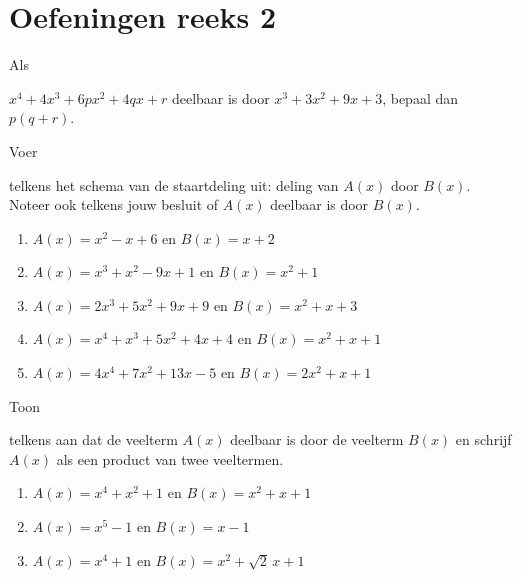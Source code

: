 \documentclass{ximera}
\begin{document}
\section*{Oefeningen reeks 2}

\begin{exercise} 
\hypertarget{oef2.6}{Als} $x^4 + 4x^3 + 6px^2 + 4qx + r$ deelbaar is door $x^3 + 3x^2 + 9x + 3$, bepaal dan $p(q+r)$.
\end{exercise} 

\begin{exercise} 
\hypertarget{oef2.7}{Voer} telkens het schema van de staartdeling uit: deling van $A(x)$ door $B(x)$. Noteer ook telkens jouw besluit of $A(x)$ deelbaar is door $B(x)$.
\begin{enumerate}
\item
$A(x) = x^2-x+6$ \quad en \quad $B(x) = x+2$
\item
$A(x) = x^3+x^2-9x+1$ \quad en \quad $B(x) = x^2+1$
\item
$A(x) = 2x^3 +5x^2+9x+9$ \quad en \quad $B(x) = x^2 + x + 3$ 
\item
$A(x) = x^4 + x^3 + 5x^2 + 4x + 4$ \quad en \quad $B(x) = x^2 + x + 1$  
\item
$A(x) = 4x^4 + 7x^2 + 13x - 5$ \quad en \quad $B(x) = 2x^2 + x + 1$
\end{enumerate}
\end{exercise} 

\pagebreak

\begin{exercise} 
\hypertarget{oef2.8}{Toon} telkens aan dat de veelterm $A(x)$ deelbaar is door de veelterm $B(x)$ en schrijf $A(x)$ als een product van twee veeltermen.
\begin{enumerate}
\item
$A(x) = x^4 + x^2 + 1$ \quad en \quad $B(x) = x^2 + x + 1$
\item
$A(x) = x^5 - 1$ \quad en \quad $B(x) = x - 1$
\item
$A(x) = x^4 + 1$ \quad en \quad $B(x) = x^2 + \sqrt{2}\,x + 1$
\end{enumerate}
\end{exercise} 
\end{document}
